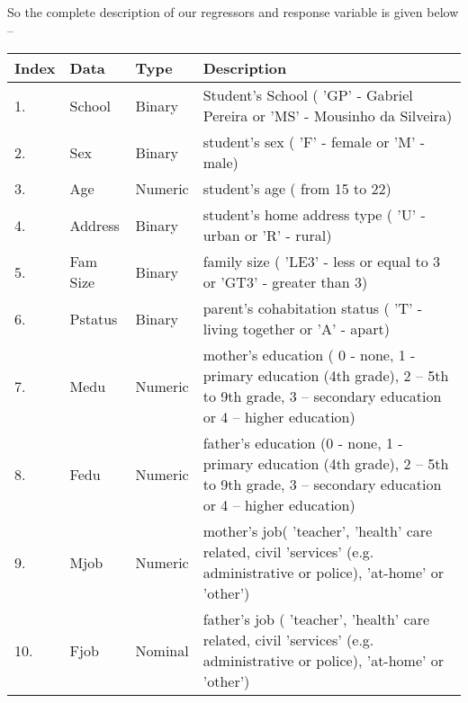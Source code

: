 \documentclass[A4paper,11pt]{report}
\begin{document}
	So the complete description of our regressors and response variable is given below --\\
	\begin{table}[ht]
		\centering
		\begin{adjustbox}{width = 1\textwidth,center = \textwidth}
			\small
			\begin{tabular}{||l|l|l|l||}
				\hline
				\hline
				\textbf{Index} & \textbf{Data} & \textbf{Type} & \textbf{Description}\\
				\hline
				\hline
				1.&School & Binary & Student's School ( 'GP' - Gabriel Pereira or 'MS' - Mousinho da Silveira)\\
				2.&Sex & Binary & student's sex ( 'F' - female or 'M' - male)\\
				3.&Age & Numeric & student's age ( from 15 to 22) \\
				4.&Address & Binary & student's home address type ( 'U' - urban or 'R' - rural) \\
				5.&Fam Size & Binary & family size ( 'LE3' - less or equal to 3 or 'GT3' - greater than 3)\\
				6.&Pstatus & Binary & parent's cohabitation status ( 'T' - living together or 'A' - apart)\\
				7.&Medu & Numeric &	mother's education ( 0 - none, 1 - primary education (4th grade), 2 – 5th to 9th grade, 3 – secondary education or 4 – higher education)\\
				8.&Fedu & Numeric & father's education (0 - none, 1 - primary education (4th grade), 2 – 5th to 9th grade, 3 – secondary education or 4 – higher education)\\
				9.&Mjob & Numeric &	mother's job( 'teacher', 'health' care related, civil 'services' (e.g. administrative or police), 'at-home' or 'other')\\
				10.&Fjob & Nominal & father's job ( 'teacher', 'health' care related, civil 'services' (e.g. administrative or police), 'at-home' or 'other')\\

\end{tabular}
\end{adjustbox}
\end{table}
\end{document}
